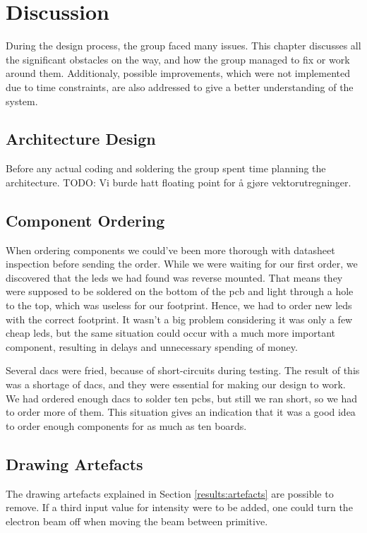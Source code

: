 \chapter{Discussion}

During the design process, the group faced many issues. This chapter discusses all the significant obstacles on the way, and how the group managed to fix or work around them. Additionaly, possible improvements, which were not implemented due to time constraints, are also addressed to give a better understanding of the system.

\section{Architecture Design}
Before any actual coding and soldering the group spent time planning the architecture.
TODO: Vi burde hatt floating point for å gjøre vektorutregninger.



\section{Component Ordering}
When ordering components we could've been more thorough with datasheet inspection before sending the order. While we were waiting for our first order, we discovered that the \gls{led}s we had found was reverse mounted. That means they were supposed to be soldered on the bottom of the \gls{pcb} and light through a hole to the top, which was useless for our footprint. Hence, we had to order new \gls{led}s with the correct footprint. It wasn't a big problem considering it was only a few cheap \gls{led}s, but the same situation could occur with a much more important component, resulting in delays and unnecessary spending of money.

Several \gls{dac}s were fried, because of short-circuits during testing. The result of this was a shortage of \gls{dac}s, and they were essential for making our design to work. We had ordered enough \gls{dac}s to solder ten \gls{pcb}s, but still we ran short, so we had to order more of them. This situation gives an indication that it was a good idea to order enough components for as much as ten boards.



\section{Drawing Artefacts}
\label{discussion:artefacts}
The drawing artefacts explained in Section \ref{results:artefacts} are possible to remove.
If a third input value for intensity were to be added, one could turn the electron beam off when moving the beam between primitive.

